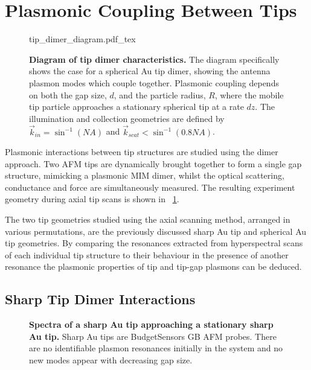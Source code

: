 \documentclass[a4paper]{article}
\begin{document}
\section{Plasmonic Coupling Between Tips}

\begin{figure}[h]
\centering
\def\svgwidth{0.5\textwidth}
{tip_dimer_diagram.pdf_tex}
\caption[Diagram of tip dimer characteristics]{\textbf{Diagram of tip dimer characteristics.} The diagram specifically shows the case for a spherical Au tip dimer, showing the antenna plasmon modes which couple together. Plasmonic coupling depends on both the gap size, $d$, and the particle radius, $R$, where the mobile tip particle approaches a stationary spherical tip at a rate $dz$. The illumination and collection geometries are defined by $\vec{k}_{in} = \sin^{-1}(\mathit{NA})$ and $\vec{k}_{scat} < \sin^{-1}(0.8\mathit{NA})$.}
\label{fig:tip_dimer_diagram}
\end{figure}

Plasmonic interactions between tip structures are studied using the dimer approach. Two AFM tips are dynamically brought together to form a single gap structure, mimicking a plasmonic MIM dimer, whilst the optical scattering, conductance and force are simultaneously measured. The resulting experiment geometry during axial tip scans is shown in \figurename~\ref{fig:tip_dimer_diagram}.

The two tip geometries studied using the axial scanning method, arranged in various permutations, are the previously discussed sharp Au tip and spherical Au tip geometries. By comparing the resonances extracted from hyperspectral scans of each individual tip structure to their behaviour in the presence of another resonance the plasmonic properties of tip and tip-gap plasmons can be deduced.

\subsection{Sharp Tip Dimer Interactions}

\begin{figure}[h]
\centering
\caption[Spectra of a sharp Au tip approaching a stationary sharp Au tip]{\textbf{Spectra of a sharp Au tip approaching a stationary sharp Au tip.} Sharp Au tips are BudgetSensors GB AFM probes. There are no identifiable plasmon resonances initially in the system and no new modes appear with decreasing gap size.}
\label{fig:sharp_tip_scan}
\end{figure}
\end{document}

